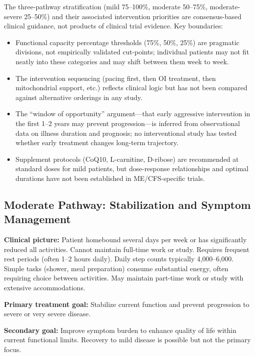 \begin{limitation}
The three-pathway stratification (mild 75--100\%, moderate 50--75\%, moderate-severe 25--50\%) and their associated intervention priorities are consensus-based clinical guidance, not products of clinical trial evidence. Key boundaries:
\begin{itemize}
    \item Functional capacity percentage thresholds (75\%, 50\%, 25\%) are pragmatic divisions, not empirically validated cut-points; individual patients may not fit neatly into these categories and may shift between them week to week.
    \item The intervention sequencing (pacing first, then OI treatment, then mitochondrial support, etc.) reflects clinical logic but has not been compared against alternative orderings in any study.
    \item The ``window of opportunity'' argument---that early aggressive intervention in the first 1--2 years may prevent progression---is inferred from observational data on illness duration and prognosis; no interventional study has tested whether early treatment changes long-term trajectory.
    \item Supplement protocols (CoQ10, L-carnitine, D-ribose) are recommended at standard doses for mild patients, but dose-response relationships and optimal durations have not been established in ME/CFS-specific trials.
\end{itemize}
\end{limitation}

\subsection{Moderate Pathway: Stabilization and Symptom Management}
\label{sec:pathway-moderate}

\begin{keypoint}
\textbf{Clinical picture:} Patient homebound several days per week or has significantly reduced all activities. Cannot maintain full-time work or study. Requires frequent rest periods (often 1--2 hours daily). Daily step counts typically 4,000--6,000. Simple tasks (shower, meal preparation) consume substantial energy, often requiring choice between activities. May maintain part-time work or study with extensive accommodations.

\textbf{Primary treatment goal:} Stabilize current function and prevent progression to severe or very severe disease.

\textbf{Secondary goal:} Improve symptom burden to enhance quality of life within current functional limits. Recovery to mild disease is possible but not the primary focus.
\end{keypoint}

